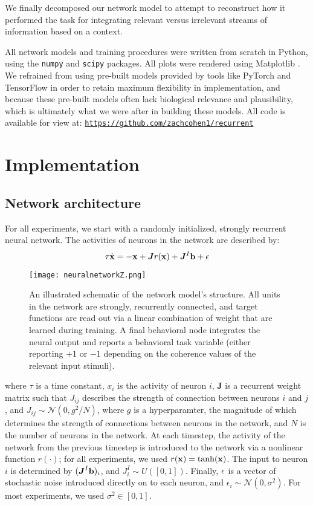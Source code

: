 \documentclass[12pt,a4paper,final]{iopart}
\begin{document}
We finally decomposed our network model to attempt to reconstruct how it performed the task for integrating relevant versus irrelevant streams of information based on a context.

All network models and training procedures were written from scratch in Python, using the \texttt{numpy} and \texttt{scipy} packages. All plots were rendered using Matplotlib \cite{Hunter:2007}. We refrained from using pre-built models provided by tools like PyTorch and TensorFlow in order to retain maximum flexibility in implementation, and because these pre-built models often lack biological relevance and plausibility, which is ultimately what we were after in building these models. All code is available for view at: \hyperref[https://github.com/zachcohen1/recurrent]{\texttt{https://github.com/zachcohen1/recurrent}}

\section{Implementation}
\label{sec:imp}
\subsection{Network architecture}
For all experiments, we start with a randomly initialized, strongly recurrent neural network. The activities of neurons in the network are described by:
\begin{equation}
    \tau \dot{{\bf x}} = -{\bf x} + \boldsymbol{J}r({\bf x}) + \boldsymbol{J}^I{\bf b} + {\bf \epsilon}
\end{equation}

\begin{figure}
    \centering
    \texttt{[image: neuralnetworkZ.png]}
    \caption{An illustrated schematic of the network model's structure. All units in the network are strongly, recurrently connected, and target functions are read out via a linear combination of weight that are learned during training. A final behavioral node integrates the neural output and reports a behavioral task variable (either reporting $+1$ or $-1$ depending on the coherence values of the relevant input stimuli).}
    \label{fig:my_label}
\end{figure}

where $\tau$ is a time constant, $x_i$ is the activity of neuron $i$, $\boldsymbol{J}$ is a recurrent weight matrix such that $J_{ij}$ describes the strength of connection between neurons $i$ and $j$, and $J_{ij} \sim \mathcal{N}(0, g^2/N)$, where $g$ is a hyperparamter, the magnitude of which determines the strength of connections between neurons in the network, and $N$ is the number of neurons in the network. At each timestep, the activity of the network from  the previous timestep is introduced to the network via a nonlinear function $r(\cdot)$; for all experiments, we used $r({\bf x}) = \tanh({\bf x})$. The input to neuron $i$ is determined by $(\boldsymbol{J}^I{\bf b})_i$, and $J^I_i \sim U([0, 1])$. Finally, ${\bf \epsilon}$ is a vector of stochastic noise introduced directly on to each neuron, and $\epsilon_i \sim \mathcal{N}(0, \sigma^2)$. For most experiments, we used $\sigma^2 \in [0, 1]$.
\end{document}
